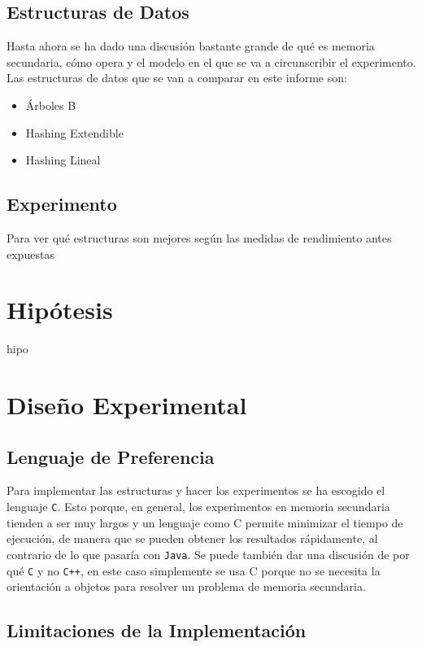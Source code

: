 \documentclass[12pt,letterpaper]{report}
\begin{document}
\subsection{Estructuras de Datos}
Hasta ahora se ha dado una discusión bastante grande de qué es memoria secundaria, cómo opera y el modelo en el que se va a circunscribir el experimento. Las estructuras de datos que se van a comparar en este informe son:

\begin{itemize}
\item Árboles B
\item Hashing Extendible
\item Hashing Lineal
\end{itemize}

\subsection{Experimento}

Para ver qué estructuras son mejores según las medidas de rendimiento antes expuestas 



\section{Hipótesis}
hipo

\section{Diseño Experimental}

\subsection{Lenguaje de Preferencia}

Para implementar las estructuras y hacer los experimentos se ha escogido el lenguaje \texttt{C}. Esto porque, en general, los experimentos en memoria secundaria tienden a ser muy largos y un lenguaje como C permite minimizar el tiempo de ejecución, de manera que se pueden obtener los resultados rápidamente, al contrario de lo que pasaría con \texttt{Java}. Se puede también dar una discusión de por qué \texttt{C} y no \texttt{C++}, en este caso simplemente se usa C porque no se necesita la orientación a objetos para resolver un problema de memoria secundaria.

\subsection{Limitaciones de la Implementación}
\end{document}

